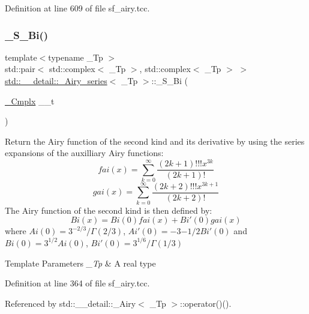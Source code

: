 Definition at line 609 of file sf\+\_\+airy.\+tcc.

\mbox{\label{classstd_1_1____detail_1_1__Airy__series_ac983d76e4cf469930d6712bf2d2caa1f}} 
\subsubsection{\texorpdfstring{\+\_\+\+S\+\_\+\+Bi()}{\_S\_Bi()}}
{\footnotesize\ttfamily template$<$typename \+\_\+\+Tp $>$ \\
std\+::pair$<$ std\+::complex$<$ \+\_\+\+Tp $>$, std\+::complex$<$ \+\_\+\+Tp $>$ $>$ \hyperlink{classstd_1_1____detail_1_1__Airy__series}{std\+::\+\_\+\+\_\+detail\+::\+\_\+\+Airy\+\_\+series}$<$ \+\_\+\+Tp $>$\+::\+\_\+\+S\+\_\+\+Bi (\begin{DoxyParamCaption}\item[{\hyperlink{classstd_1_1____detail_1_1__Airy__series_ab41161caa54609f4735987fbaed41d9d}{\+\_\+\+Cmplx}}]{\+\_\+\+\_\+t }\end{DoxyParamCaption})\hspace{0.3cm}{\ttfamily [static]}}

Return the Airy function of the second kind and its derivative by using the series expansions of the auxilliary Airy functions\+: \[ fai(x) = \sum_{k=0}^\infty \frac{(2k+1)!!!x^{3k}}{(2k+1)!} \] \[ gai(x) = \sum_{k=0}^\infty \frac{(2k+2)!!!x^{3k+1}}{(2k+2)!} \] The Airy function of the second kind is then defined by\+: \[ Bi(x) = Bi(0)fai(x) + Bi'(0)gai(x) \] where $ Ai(0) = 3^{-2/3}/\Gamma(2/3) $, $ Ai'(0) = -3{-1/2}Bi'(0) $ and $ Bi(0) = 3^{1/2}Ai(0) $, $ Bi'(0) = 3^{1/6}/\Gamma(1/3) $


\begin{DoxyTemplParams}{Template Parameters}
{\em \+\_\+\+Tp} & A real type \\
\hline
\end{DoxyTemplParams}


Definition at line 364 of file sf\+\_\+airy.\+tcc.



Referenced by std\+::\+\_\+\+\_\+detail\+::\+\_\+\+Airy$<$ \+\_\+\+Tp $>$\+::operator()().

